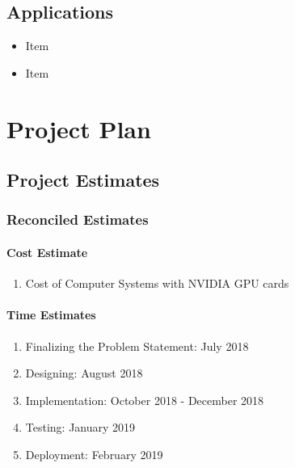 \documentclass[oneside,a4paper,12pt, times]{book}
\begin{document}
\section{Applications}
\begin{itemize}
	\item Item
    \item Item
\end{itemize}







\chapter{Project Plan}

\section{Project Estimates}

\subsection{Reconciled Estimates}
\subsubsection{Cost Estimate}
\begin{enumerate}
	\item Cost of Computer Systems with NVIDIA GPU cards

\end{enumerate}

\subsubsection{Time Estimates}
\begin{enumerate}
	\item Finalizing the Problem Statement: July 2018
	\item Designing: August 2018
	\item Implementation: October 2018 - December 2018
	\item Testing: January 2019
	\item Deployment: February 2019
\end{enumerate}
\end{document}
